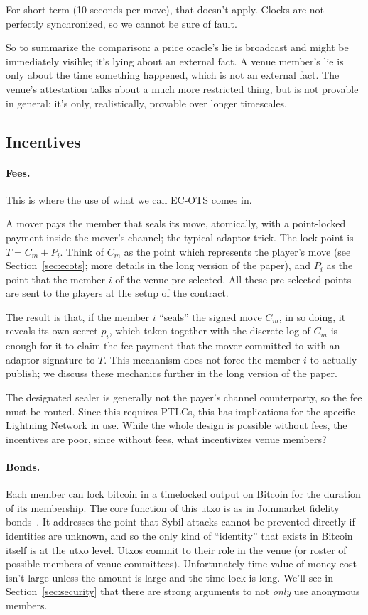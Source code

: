 \documentclass[11pt]{article}
\begin{document}
For short term (10 seconds per move), that doesn't apply. Clocks are not perfectly synchronized, so we cannot be sure of fault.

So to summarize the comparison: a price oracle's lie is broadcast and might be immediately visible; it's lying about an external fact. A venue member's lie is only about the time something happened, which is not an external fact. The venue's attestation talks about a much more restricted thing, but is not provable in general; it's only, realistically, provable over longer timescales.

\subsection{Incentives}

\paragraph{Fees.} This is where the use of what we call EC-OTS comes in.

A mover pays the member that seals its move, atomically, with a point-locked payment inside the mover's channel; the typical adaptor trick. The
lock point is $T = C_m + P_{i}$. Think of $C_m$ as the point which represents the player's move (see Section~\ref{sec:ecots}; more details in the long version of the paper), and $P_{i}$ as the point that the member $i$ of the venue pre-selected. All these pre-selected points are sent to the players at the setup of the contract.

The result is that, if the member $i$ ``seals'' the signed move $C_m$, in so doing, it reveals its own secret $p_{i}$, which taken together with the discrete log of $C_m$ is enough for it to claim the fee payment that the mover committed to with an adaptor signature to $T$. This mechanism does not force the member $i$ to actually publish; we discuss these mechanics further in the long version of the paper.

The designated sealer is generally not the payer's channel counterparty,
so the fee must be routed. Since this requires PTLCs, this has implications for the specific Lightning Network in use. While the whole design is possible without fees, the incentives are poor, since without fees, what incentivizes venue members?

\paragraph{Bonds.} Each member can lock bitcoin in a timelocked output on Bitcoin for the duration of its membership. The core function of this utxo is as in Joinmarket fidelity bonds~\cite{fidelity}. It addresses the point that Sybil attacks cannot be prevented directly if identities are unknown, and so the only kind of ``identity'' that exists in Bitcoin itself is at the utxo level. Utxos commit to their role in the venue (or roster of possible members of venue committees). Unfortunately time-value of money cost isn't large unless the amount is large and the time lock is long. We'll see in Section~\ref{sec:security} that there are strong arguments to not \emph{only} use anonymous members.
\end{document}
